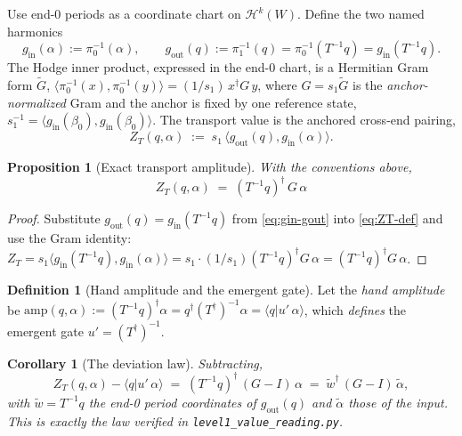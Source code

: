 \documentclass[11pt]{article}
\newcommand{\braket}[2]{\langle #1 \vert #2 \rangle}
\newcommand{\inner}[2]{\langle #1, #2 \rangle}
\newcommand{\harm}{\mathcal{H}}              %
\newcommand{\gin}{g_{\mathrm{in}}}
\newcommand{\gout}{g_{\mathrm{out}}}
\newcommand{\ZT}{Z_{T}}
\newcommand{\code}[1]{\texttt{#1}}
\theoremstyle{plain}
\newtheorem{proposition}[theorem]{Proposition}
\newtheorem{corollary}[theorem]{Corollary}
\theoremstyle{definition}
\newtheorem{definition}[theorem]{Definition}
\begin{document}
Use end-0 periods as a coordinate chart on $\harm^k(W)$. Define the two named harmonics
\begin{equation}
  \gin(\alpha) := \pi_0^{-1}(\alpha),\qquad
  \gout(q) := \pi_1^{-1}(q) = \pi_0^{-1}(T^{-1}q) = \gin(T^{-1}q).
  \label{eq:gin-gout}
\end{equation}
The Hodge inner product, expressed in the end-0 chart, is a Hermitian Gram form $\tilde G$,
$\inner{\pi_0^{-1}(x)}{\pi_0^{-1}(y)} = (1/s_1)\,x^\dagger G\,y$, where $G=s_1\tilde G$ is the
\emph{anchor-normalized} Gram and the anchor is fixed by one reference state,
$s_1^{-1}=\inner{\gin(\beta_0)}{\gin(\beta_0)}$. The transport value is the anchored
cross-end pairing,
\begin{equation}
  \ZT(q,\alpha) \;:=\; s_1\,\inner{\gout(q)}{\gin(\alpha)}.
  \label{eq:ZT-def}
\end{equation}

\begin{proposition}[Exact transport amplitude]
\label{prop:ZT}
With the conventions above,
\begin{equation}
  \boxed{\;\ZT(q,\alpha) \;=\; (T^{-1}q)^\dagger\,G\,\alpha\;}
  \label{eq:ZT}
\end{equation}
\end{proposition}
\begin{proof}
Substitute $\gout(q)=\gin(T^{-1}q)$ from \eqref{eq:gin-gout} into \eqref{eq:ZT-def} and use
the Gram identity:
$\ZT = s_1\inner{\gin(T^{-1}q)}{\gin(\alpha)} = s_1\cdot(1/s_1)(T^{-1}q)^\dagger G\,\alpha
= (T^{-1}q)^\dagger G\,\alpha$.
\end{proof}

\begin{definition}[Hand amplitude and the emergent gate]
Let the \emph{hand amplitude} be $\mathrm{amp}(q,\alpha):=(T^{-1}q)^\dagger\alpha
= q^\dagger (T^\dagger)^{-1}\alpha = \braket{q}{u'\,\alpha}$, which \emph{defines} the
emergent gate $u'=(T^\dagger)^{-1}$.
\end{definition}

\begin{corollary}[The deviation law]
\label{cor:devlaw}
Subtracting,
\begin{equation}
  \ZT(q,\alpha) - \braket{q}{u'\,\alpha}
    \;=\; (T^{-1}q)^\dagger\,(G-I)\,\alpha
    \;=\; \tilde w^\dagger\,(G-I)\,\tilde\alpha,
  \label{eq:devlaw}
\end{equation}
with $\tilde w = T^{-1}q$ the end-0 period coordinates of $\gout(q)$ and
$\tilde\alpha$ those of the input. This is exactly the law verified in
\code{level1\_value\_reading.py}.
\end{corollary}
\end{document}

